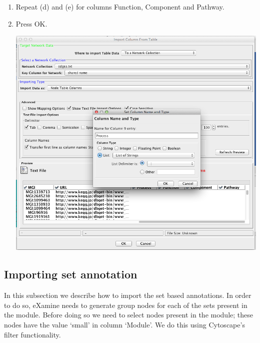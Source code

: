 \documentclass[a4paper,11pt]{article}
\begin{document}
\begin{enumerate}
\begin{enumerate}
      \item Repeat (d) and (e) for columns Function, Component and Pathway.
      \item Press OK.
        \begin{center}
          \includegraphics[width=.7\textwidth]{images/2.png}
        \end{center}
    \end{enumerate}
\end{enumerate}

\subsection{Importing set annotation}

In this subsection we describe how to import the set based annotations. In order
to do so, eXamine needs to generate group nodes for each of the sets present in the
module. Before doing so we need to select nodes present in the module; these
nodes have the value `small' in column `Module'. We do this using Cytoscape's
filter functionality.
\end{document}
